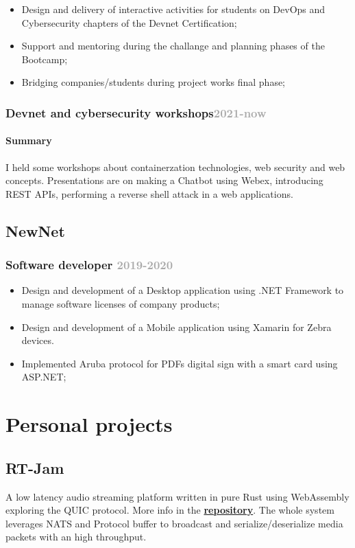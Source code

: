 \documentclass[11pt,a4paper]{article}
\begin{document}
  \begin{itemize}
    \item Design and delivery of interactive activities for students on DevOps and Cybersecurity chapters of the Devnet Certification;
    \item Support and mentoring during the challange and planning phases of the Bootcamp;
    \item Bridging companies/students during project works final phase;
  \end{itemize}

  \subsubsection{Devnet and cybersecurity workshops\hfill \textcolor{darkgray}{\small{2021-now}}}

  \paragraph{Summary}I held some workshops about containerzation technologies, web security and web concepts.
  Presentations are on making a Chatbot using Webex, introducing REST APIs, performing a reverse shell attack in a 
  web applications.
  \subsection{NewNet}
  \subsubsection{Software developer \hfill \textcolor{darkgray}{\small{2019-2020}}}
  \begin{itemize}
    \item Design and development of a Desktop application using .NET Framework to manage software licenses of company products;
    \item Design and development of a Mobile application using Xamarin for Zebra devices.
    \item Implemented Aruba protocol for PDFs digital sign with a smart card using ASP.NET;
  \end{itemize}

  \section{Personal projects}
  \subsection{RT-Jam} A low latency audio streaming platform written in pure Rust using WebAssembly exploring 
  the QUIC protocol. More info in the \href{https://github.com/alarmfox/rt-jam}{\textbf{repository}}. The whole system leverages 
  NATS and Protocol buffer to broadcast and serialize/deserialize media packets with an high 
  throughput.
\end{document}
